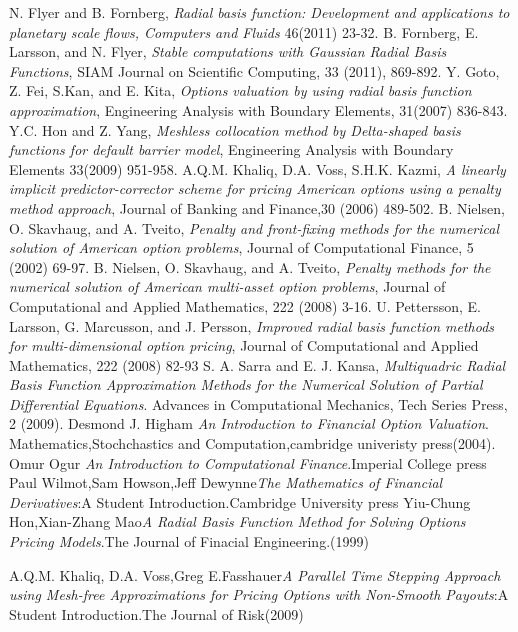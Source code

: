 \documentclass[hyperref={pdfpagelabels=false}]{beamer}
\begin{document}
\begin{frame}[allowframebreaks]
\begin{thebiblio}{}
		N. Flyer and B. Fornberg,\emph{ Radial basis function: Development
			and applications to planetary scale flows, Computers and Fluids}
		46(2011) 23-32.
		B. Fornberg, E. Larsson, and N. Flyer,\emph{ Stable computations
			with Gaussian Radial Basis Functions}, SIAM Journal on Scientific
		Computing, 33 (2011), 869-892.
		Y. Goto, Z. Fei, S.Kan, and E. Kita, \emph{Options valuation by
			using radial basis function approximation}, Engineering Analysis
		with Boundary Elements, 31(2007) 836-843.
		Y.C. Hon and Z. Yang, \emph{Meshless collocation method by
			Delta-shaped basis functions for default barrier model}, Engineering
		Analysis with Boundary Elements 33(2009) 951-958.
		A.Q.M. Khaliq, D.A. Voss, S.H.K. Kazmi,   \emph{A linearly implicit
			predictor-corrector scheme for pricing American options using a
			penalty method approach}, Journal of Banking and Finance,30 (2006)
		489-502.
		B. Nielsen, O. Skavhaug, and A. Tveito, \emph{Penalty and
			front-fixing methods for the numerical solution of American option
			problems}, Journal of Computational Finance, 5 (2002) 69-97.
		B. Nielsen, O. Skavhaug, and A. Tveito,\emph{ Penalty methods for
			the numerical solution of American multi-asset option problems},
		Journal of Computational and Applied Mathematics, 222 (2008) 3-16.
		U.  Pettersson, E. Larsson, G.  Marcusson, and J. Persson,
		\emph{Improved radial basis function methods for multi-dimensional
			option pricing}, Journal of Computational and Applied Mathematics,
		222 (2008) 82-93
		S. A. Sarra and E. J. Kansa,  \emph{Multiquadric Radial Basis
			Function Approximation Methods for the Numerical Solution of Partial
			Differential Equations}. Advances in Computational Mechanics, Tech
		Series Press, 2 (2009).
		Desmond J. Higham  \emph{An Introduction to Financial Option
			Valuation}. Mathematics,Stochchastics and Computation,cambridge
		univeristy press(2004).
		Omur Ogur \emph{An Introduction to Computational Finance}.Imperial
		College press
		Paul Wilmot,Sam Howson,Jeff Dewynne\emph{The Mathematics of
			Financial Derivatives}:A Student Introduction.Cambridge University
		press
		Yiu-Chung Hon,Xian-Zhang Mao\emph{A Radial Basis Function Method for
			Solving Options Pricing Models}.The Journal of Finacial
		Engineering.(1999)
		
		A.Q.M. Khaliq, D.A. Voss,Greg E.Fasshauer\emph{A Parallel Time
			Stepping Approach using Mesh-free Approximations for Pricing Options
			with Non-Smooth Payouts}:A Student Introduction.The Journal of
		Risk(2009)
	\end{thebiblio}
\end{frame}
\end{document}

